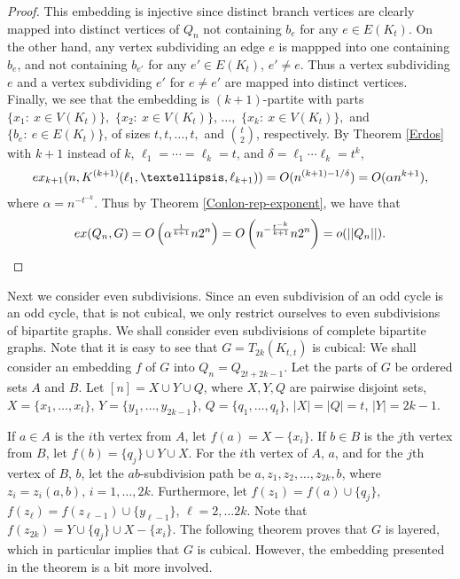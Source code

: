 \documentclass[11pt, a4paper]{article}
\newcommand{\ex}{{\rm  ex}}
\begin{document}
\begin{proof}
\begin{table}[h]
\caption{Indicator vectors for $f(x), f(z_1), \ldots, f(z_{2k+1}), f(y)$, respectively, restricted to $B_e\cup A_{x}\cup A_y$, for $k=1, 2, $ and $3$.\label{Kn}}
\end{table}
  
      
      

This embedding is injective since distinct branch vertices are clearly mapped into distinct vertices of $Q_n$ not containing $b_e$ for any $e\in E(K_t)$.
On the other hand, any vertex subdividing an edge $e$ is mappped into one containing $b_e$, and not containing $b_{e'}$ for any $e'\in E(K_t)$, $e'\neq e$.
Thus a vertex subdividing $e$ and a vertex subdividing $e'$ for $e\neq e'$ are mapped into distinct vertices.\\

Finally, we see that the embedding is $(k+1)$-partite with parts $\{ x_1: ~ x\in V(K_t)\},$  $ \{x_2: ~ x\in V(K_t)\}$, $\ldots, $
$\{ x_k: ~ x\in V(K_t)\},$ and $\{b_e:~  e\in E(K_t)\}$, of sizes $t, t, \ldots, t, $ and $\binom{t}{2}$, respectively. By  Theorem \ref{Erdos} with $k+1$ instead of $k$, $\ell_1= \cdots = \ell_k = t$,  and  $\delta = \ell_1 \cdots \ell_{k} = t^k$,   $$\ex_{k+1}(n, K^{(k+1)}(\ell_1, \ldots, \ell_{k+1})) = O(n^{(k+1) - 1/\delta}) = O(\alpha n^{k+1}),$$ 
where  $\alpha =  n^{-t^{-k}}.$ 
Thus by Theorem \ref{Conlon-rep-exponent}, we have that  $$\ex(Q_n, G) =  O\left(\alpha^{\frac{1}{k+1}} n2^n\right)=  O\left(n^{-\frac{{t^{-k}}}{k+1}} n2^n\right) = o(||Q_n||).$$
\end{proof}	
		
		
		
Next we consider even subdivisions. Since an even subdivision of an odd cycle is an odd cycle, that is not cubical, we only restrict ourselves to even subdivisions of bipartite graphs.  We shall consider even subdivisions of complete bipartite graphs. Note that  it is easy to see that $G=T_{2k}(K_{t,t})$ is cubical:  We shall consider an  embedding $f$ of  $G$ into $Q_n= Q_{2t+ 2k-1}$.  Let the parts of $G$ be ordered sets $A$ and $B$.  
Let $[n]= X\cup Y\cup Q$, where $X, Y, Q$ are pairwise disjoint sets, 
$X=\{x_1, \ldots, x_t\}$,  
$Y=\{y_1, \ldots, y_{2k-1}\}$, 
 $Q=\{q_1, \ldots, q_t\}$,  $|X|=|Q|=t$,  $|Y|=2k-1$.  

If $a\in A$ is  the  $i$th vertex from $A$, let $f(a) = X-\{x_i\}$. If $b\in B$ is the $j$th vertex from $B$, let $f(b) = \{q_j\} \cup Y\cup X$.
For the $i$th vertex of $A$, $a$,  and  for the $j$th vertex of $B$, $b$, let the $ab$-subdivision path be $a, z_1, z_2, \ldots, z_{2k}, b$, where $z_i=z_i(a,b)$, $i=1,\ldots, 2k$. 
Furthermore, let $f(z_1)= f(a) \cup \{q_j\}$,  $f(z_\ell) = f(z_{\ell-1})\cup \{y_{\ell -1}\}$, $\ell = 2, \ldots 2k$.  Note that $f(z_{2k}) = Y\cup \{q_j\} \cup X-\{x_i\}$.   The following theorem proves that $G$ is layered, which in particular implies that $G$ is cubical. However, the embedding presented in the theorem is a bit more involved. \\	
		
\end{document}

